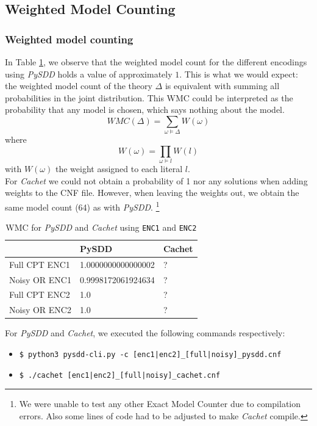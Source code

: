\documentclass{article}
\begin{document}
\newpage

\subsection{Weighted Model Counting}

\subsubsection{Weighted model counting}
In Table \ref{tab:wmc_pysdd_cachet}, we observe that the weighted model count for the different encodings using  \textit{PySDD} holds a value of approximately $1$. This is what we would expect: the weighted model count of the theory $\Delta$ is equivalent with summing all probabilities in the joint distribution. This WMC could be interpreted as the probability that any model is chosen, which says nothing about the model. 
$$WMC(\Delta) = \sum_{\omega \models \Delta} W(\omega)$$
where
$$W(\omega) = \prod_{\omega \models l}W(l)$$
with $W(\omega)$ the weight assigned to each literal $l$.\cite{chavira}\\
For \textit{Cachet} we could not obtain a probability of 1 nor any solutions when adding weights to the CNF file. However, when leaving the weights out, we obtain the same model count (64) as with \textit{PySDD}.
\footnote{We were unable to test any other Exact Model Counter due to compilation errors. Also some lines of code had to be adjusted to make \textit{Cachet} compile.}
\begin{table}[h]
\centering
\begin{tabular}{l | l l}
					&	PySDD	&		Cachet	\\\hline
	Full CPT ENC1	&	1.0000000000000002		&		?		\\
	Noisy OR ENC1	&	0.9998172061924634		&		?		\\
	Full CPT ENC2	&	1.0 &	?	\\
	Noisy OR ENC2	&	1.0		&		?		\\
\end{tabular}
\caption{WMC for \textit{PySDD} and \textit{Cachet} using \texttt{ENC1} and \texttt{ENC2}}
\label{tab:wmc_pysdd_cachet}
\end{table}

For \textit{PySDD} and \textit{Cachet}, we executed the following commands respectively:
\begin{itemize}
	\item[] \texttt{\$ python3 pysdd-cli.py -c [enc1|enc2]\_[full|noisy]\_pysdd.cnf}
	\item[] \texttt{\$ ./cachet [enc1|enc2]\_[full|noisy]\_cachet.cnf}
\end{itemize}
\end{document}
